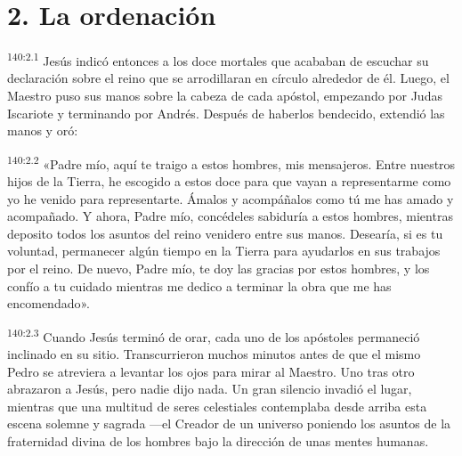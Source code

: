 \section*{2. La ordenación}
\par 
\textsuperscript{140:2.1} Jesús indicó entonces a los doce mortales que acababan de escuchar su declaración sobre el reino que se arrodillaran en círculo alrededor de él. Luego, el Maestro puso sus manos sobre la cabeza de cada apóstol, empezando por Judas Iscariote y terminando por Andrés. Después de haberlos bendecido, extendió las manos y oró:

\par 
\textsuperscript{140:2.2} «Padre mío, aquí te traigo a estos hombres, mis mensajeros. Entre nuestros hijos de la Tierra, he escogido a estos doce para que vayan a representarme como yo he venido para representarte. Ámalos y acompáñalos como tú me has amado y acompañado. Y ahora, Padre mío, concédeles sabiduría a estos hombres, mientras deposito todos los asuntos del reino venidero entre sus manos. Desearía, si es tu voluntad, permanecer algún tiempo en la Tierra para ayudarlos en sus trabajos por el reino. De nuevo, Padre mío, te doy las gracias por estos hombres, y los confío a tu cuidado mientras me dedico a terminar la obra que me has encomendado».

\par 
\textsuperscript{140:2.3} Cuando Jesús terminó de orar, cada uno de los apóstoles permaneció inclinado en su sitio. Transcurrieron muchos minutos antes de que el mismo Pedro se atreviera a levantar los ojos para mirar al Maestro. Uno tras otro abrazaron a Jesús, pero nadie dijo nada. Un gran silencio invadió el lugar, mientras que una multitud de seres celestiales contemplaba desde arriba esta escena solemne y sagrada ---el Creador de un universo poniendo los asuntos de la fraternidad divina de los hombres bajo la dirección de unas mentes humanas.

